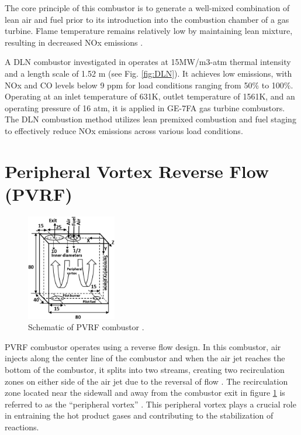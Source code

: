 The core principle of this combustor is to generate a well-mixed combination of lean air and fuel prior to its introduction into the combustion chamber of a gas turbine. Flame temperature remains relatively low by maintaining lean mixture, resulting in decreased NOx emissions \cite{SKG2017}. 

A DLN combustor investigated in \cite{Vandervort1362661} operates at 15MW/m3-atm thermal intensity and a length scale of 1.52 m (see Fig. \ref{fig:DLN}). It achieves low emissions, with NOx and CO levels below 9 ppm for load conditions ranging from 50$\%$ to 100$\%$. Operating at an inlet temperature of 631K, outlet temperature of 1561K, and an operating pressure of 16 atm, it is applied in GE-7FA gas turbine combustors. The DLN combustion method utilizes lean premixed combustion and fuel staging to effectively reduce NOx emissions across various load conditions.

\section{Peripheral Vortex Reverse Flow (PVRF)}

\begin{figure}
\vspace{-5mm}
    \centering
    \includegraphics[width=0.35\textwidth]{Chapter2/Images/PVRF.jpg}
    \caption[Schematic of PVRF combustor]{Schematic of PVRF combustor \cite{AHMAD2023101200}.}
    \label{fig:Ch2PVRF}
\end{figure}

PVRF combustor operates using a reverse flow design. In this combustor, air injects along the center line of the combustor and when the air jet reaches the bottom of the combustor, it splits into two streams, creating two recirculation zones on either side of the air jet due to the reversal of flow \cite{AHMAD2021100754}. The recirculation zone located near the sidewall and away from the combustor exit in figure \ref{fig:Ch2PVRF} is referred to as the ``peripheral vortex'' \cite{AHMAD2021100754}. This peripheral vortex plays a crucial role in entraining the hot product gases and contributing to the stabilization of reactions.


